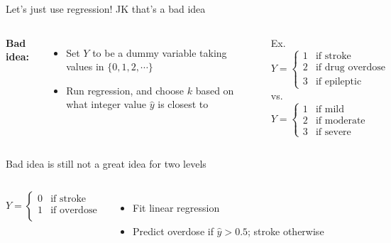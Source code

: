 \documentclass[aspectratio=169,usenames,dvipsnames]{beamer}
\newcommand{\InstructorNotes}[1]{\textit{\color{orange}#1}}
\newcommand{\InstructorList}[1]{
\begin{itemize}
	\color{orange}
	#1
\end{itemize}
}
\renewcommand{\InstructorNotes}[1]{} \renewcommand{\InstructorList}[1]{}
\begin{document}
\begin{frame}[t]{Let's just use regression!}
	{JK that's a bad idea}

\begin{columns}
\centering
\textbf{Bad idea:}
\begin{itemize}
	\item Set $Y$ to be a dummy variable taking values in $\{0,1,2,\cdots\}$
	\item Run regression, and choose $k$ based on what integer value $\hat y$ is closest to
\end{itemize}

Ex.
\begin{equation*}
	Y =
	\begin{cases}
		1 & \text{if stroke }\\
		2 & \text{if drug overdose }\\
		3 & \text{if epileptic seizure}
	\end{cases}
\end{equation*}
vs.
\begin{equation*}
	Y =
	\begin{cases}
		1 & \text{if mild }\\
		2 & \text{if moderate }\\
		3 & \text{if severe}
	\end{cases}
\end{equation*}
\end{columns}
\InstructorNotes{Ordering implies something about closeness. Draw a number line to emphasize this distinction. }
\end{frame}
\begin{frame}[c]{Bad idea is still not a great idea for two levels}

\begin{columns}
\centering

\begin{equation*}
	Y =
	\begin{cases}
		0 & \text{if stroke}\\
		1 & \text{if overdose}\\
	\end{cases}
\end{equation*}
\begin{itemize}
	\item Fit linear regression
	\item Predict overdose if $\hat y > 0.5$; stroke otherwise
\end{itemize}

\InstructorList{
\item Could spit out values outside of [0,1]
\item Can't interpret this as probability
}
\centering
\InstructorList{
\item Regression methods can't accomdate qualitative response with more than two classes
\item Doesn't provide meaningful estimates of $\Pr(Y \mid X)$ even with two classes
}
\end{columns}

\end{frame}
\end{document}
